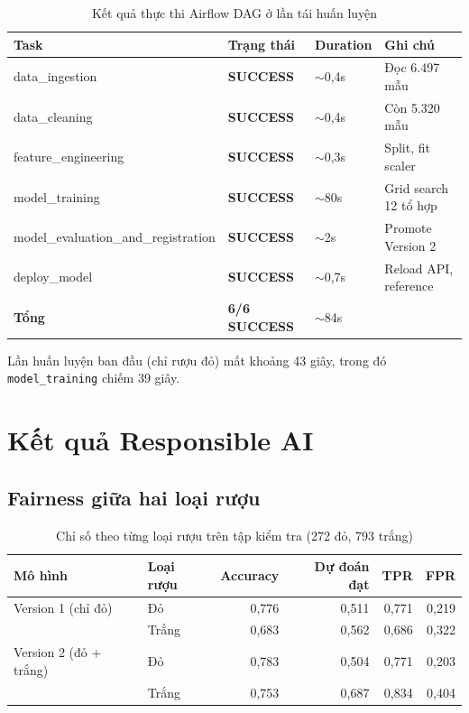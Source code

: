 \documentclass[12pt,a4paper]{report}
\begin{document}
\begin{table}[H]
  \centering
  \caption{Kết quả thực thi Airflow DAG ở lần tái huấn luyện}
  \label{tab:dag-result}
  \begin{tabular}{llll}
    \toprule
    \textbf{Task} & \textbf{Trạng thái} & \textbf{Duration} & \textbf{Ghi chú} \\
    \midrule
    data\_ingestion                      & \textcolor{green!60!black}{\textbf{SUCCESS}} & $\sim$0,4s & Đọc 6.497 mẫu \\
    data\_cleaning                       & \textcolor{green!60!black}{\textbf{SUCCESS}} & $\sim$0,4s & Còn 5.320 mẫu \\
    feature\_engineering                 & \textcolor{green!60!black}{\textbf{SUCCESS}} & $\sim$0,3s & Split, fit scaler \\
    model\_training                      & \textcolor{green!60!black}{\textbf{SUCCESS}} & $\sim$80s  & Grid search 12 tổ hợp \\
    model\_evaluation\_and\_registration & \textcolor{green!60!black}{\textbf{SUCCESS}} & $\sim$2s   & Promote Version 2 \\
    deploy\_model                        & \textcolor{green!60!black}{\textbf{SUCCESS}} & $\sim$0,7s & Reload API, reference \\
    \midrule
    \textbf{Tổng} & \textcolor{green!60!black}{\textbf{6/6 SUCCESS}} & $\sim$84s & \\
    \bottomrule
  \end{tabular}
\end{table}

Lần huấn luyện ban đầu (chỉ rượu đỏ) mất khoảng 43 giây, trong đó \texttt{model\_training} chiếm 39 giây.

\section{Kết quả Responsible AI}
\label{sec:fairness-result}

\subsection{Fairness giữa hai loại rượu}

\begin{table}[H]
  \centering
  \caption{Chỉ số theo từng loại rượu trên tập kiểm tra (272 đỏ, 793 trắng)}
  \label{tab:fairness}
  \begin{tabular}{llrrrr}
    \toprule
    \textbf{Mô hình} & \textbf{Loại rượu} & \textbf{Accuracy} & \textbf{Dự đoán đạt} & \textbf{TPR} & \textbf{FPR} \\
    \midrule
    Version 1 (chỉ đỏ)     & Đỏ    & 0,776 & 0,511 & 0,771 & 0,219 \\
                           & Trắng & 0,683 & 0,562 & 0,686 & 0,322 \\
    \midrule
    Version 2 (đỏ + trắng) & Đỏ    & 0,783 & 0,504 & 0,771 & 0,203 \\
                           & Trắng & 0,753 & 0,687 & 0,834 & 0,404 \\
    \bottomrule
  \end{tabular}
\end{table}
\end{document}
